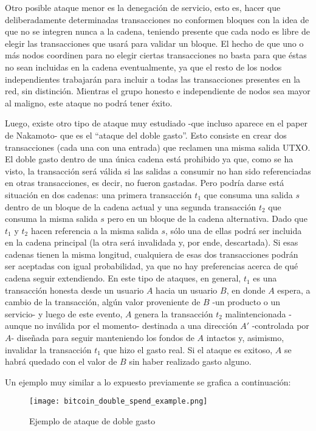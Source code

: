 Otro posible ataque menor es la denegación de servicio, esto es, hacer que deliberadamente determinadas transacciones no conformen bloques con la idea de que no se integren nunca a la cadena, teniendo presente que cada nodo es libre de elegir las transacciones que usará para validar un bloque. El hecho de que uno o más nodos coordinen para no elegir ciertas transacciones no basta para que éstas no sean incluidas en la cadena eventualmente, ya que el resto de los nodos independientes trabajarán para incluir a todas las transacciones presentes en la red, sin distinción. Mientras el grupo honesto e independiente de nodos sea mayor al maligno, este ataque no podrá tener éxito.

Luego, existe otro tipo de ataque muy estudiado -que incluso aparece en el paper de Nakamoto- que es el ``ataque del doble gasto''. Esto consiste en crear dos transacciones (cada una con una entrada) que reclamen una misma salida UTXO. El doble gasto dentro de una única cadena está prohibido ya que, como se ha visto, la transacción será válida si las salidas a consumir no han sido referenciadas en otras transacciones, es decir, no fueron gastadas. Pero podría darse está situación en dos cadenas: una primera transacción $t_1$ que consuma una salida $s$ dentro de un bloque de la cadena actual y una segunda transacción $t_2$ que consuma la misma salida $s$ pero en un bloque de la cadena alternativa. Dado que $t_1$ y $t_2$ hacen referencia a la misma salida $s$, sólo una de ellas podrá ser incluida en la cadena principal (la otra será invalidada y, por ende, descartada). Si esas cadenas tienen la misma longitud, cualquiera de esas dos transacciones podrán ser aceptadas con igual probabilidad, ya que no hay preferencias acerca de qué cadena seguir extendiendo. En este tipo de ataques, en general, $t_1$ es una transacción honesta desde un usuario $A$ hacia un usuario $B$, en donde $A$ espera, a cambio de la transacción, algún valor proveniente de $B$ -un producto o un servicio- y luego de este evento, $A$ genera la transacción $t_2$ malintencionada -aunque no inválida por el momento- destinada a una dirección $A'$ -controlada por $A$- diseñada para seguir manteniendo los fondos de $A$ intactos y, asimismo, invalidar la transacción $t_1$ que hizo el gasto real. Si el ataque es exitoso, $A$ se habrá quedado con el valor de $B$ sin haber realizado gasto alguno.

Un ejemplo muy similar a lo expuesto previamente se grafica a continuación:

\begin{figure}[H]
  \texttt{[image: bitcoin\_double\_spend\_example.png]}
  \centering
  \caption{Ejemplo de ataque de doble gasto}
  \label{fig:bitcoin-double-spend-example}
\end{figure}

